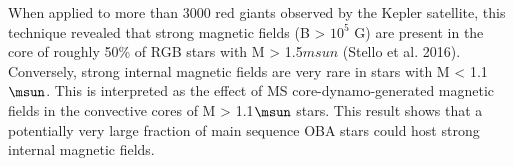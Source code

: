When applied to more than 3000 red giants observed by the Kepler satellite, this technique revealed that
strong magnetic fields (B > $10^5$ G) are present in the core of roughly 50\% of RGB stars with M > 1.5$msun$ (Stello et al. 2016).
Conversely, strong internal magnetic fields are very rare in stars with M < 1.1$\msun$. This is interpreted as the
effect of MS core-dynamo-generated magnetic fields in the convective cores of M > 1.1$\msun$ stars.
This result shows that a potentially very large fraction of main sequence OBA stars could host strong internal magnetic fields.




